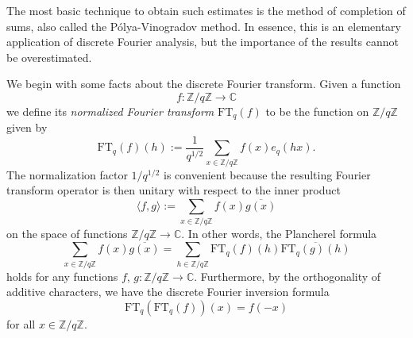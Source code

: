 \documentclass[12pt,a4paper,reqno]{amsart}
\numberwithin{equation}{section}
\newcommand{\FT}{\mathrm{FT}}
\theoremstyle{plain}
\theoremstyle{definition}
\newcommand\Z{\mathbb{Z}}
\newcommand\C{\mathbb{C}}
\newcommand\ov{\overline}
\newcommand\Zz{\mathbb{Z}}
\newcommand{\ra}{\rightarrow}
\begin{document}
The most basic technique to obtain such estimates is the method of
completion of sums, also called the P\'olya-Vinogradov method. In
essence, this is an elementary application of discrete Fourier
analysis, but the importance of the results cannot be overestimated.
\par
We begin with some facts about the discrete Fourier transform. Given a
function 
$$
f\colon\Z/q\Z\ra\C
$$ 
we define its \emph{normalized Fourier transform} $\FT_q (f)$ to be
the function on $\Z/q\Z$ given by
\begin{equation}\label{ftq-def}
\FT_q (f)(h):=\frac{1}{q^{1/2}}\sum_{x\in\Zz/q\Zz}f(x)e_q(hx).
\end{equation}
The normalization factor ${1}/{q^{1/2}}$ is convenient
because the resulting Fourier transform operator is then unitary with
respect to the inner product 
$$
\langle f,g\rangle:=\sum_{x\in \Z/q\Z}f(x)\overline{g(x)}
$$
on the space of functions $\Z/q\Z\ra \C$. In other words, the
Plancherel formula
$$
\sum_{x\in\Zz/q\Zz}f(x)\ov{g(x)}=\sum_{h\in\Zz/q\Zz}\FT_q(f)(h)\ov{\FT_q(g)(h)}
$$
holds for any functions $f$, $g\colon \Z/q\Z\ra \C$. Furthermore, by
the orthogonality of additive characters, we have the discrete Fourier
inversion formula
$$
\FT_q(\FT_q (f))(x)=f(-x)
$$
for all $x\in\Z/q\Z$.
\end{document}
